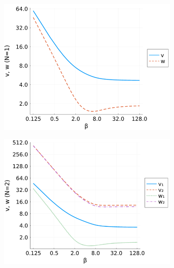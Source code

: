 \begin{figure}[!tbp]
    \centering
  \begin{subfigure}[b]{0.49\textwidth}
    \centering
    \includegraphics[width=\textwidth]{figures/vw_beta_N1.png}
  \end{subfigure}
  \hfill
  \begin{subfigure}[b]{0.49\textwidth}
    \centering
    \includegraphics[width=\textwidth]{figures/vw_beta_N2.png}
  \end{subfigure}
  \begin{subfigure}[b]{0.49\textwidth}
    \centering

\end{subfigure}
\end{figure}
